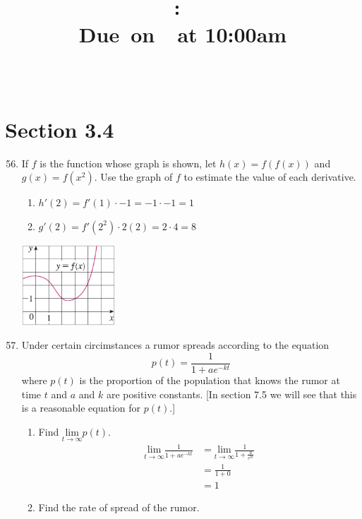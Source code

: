 \documentclass{article}
\title{
    \vspace{2in}
    \textmd{\textbf{\hmwkClass:\ \hmwkTitle}}\\
    \normalsize\vspace{0.1in}\small{Due\ on\ \hmwkDueDate\ at 10:00am}\\
    \vspace{0.1in}\large{\textit{\hmwkClassInstructor\ \hmwkClassTime}}
    \vspace{3in}
}
\author{\hmwkAuthorName}
\date{}
\begin{document}
\maketitle

\pagebreak

\section{Section 3.4}

\begin{enumerate}
\setcounter{enumi}{55}
	\item If $f$ is the function whose graph is shown, let $h(x)=f(f(x))$ and $g(x)=f(x^2)$. Use the graph of $f$ to estimate the value of each derivative.
		\begin{enumerate}
			\item $h'(2) = f'(1)\cdot -1 = -1 \cdot -1 = 1$
			\item $g'(2) = f'(2^2)\cdot 2(2) = 2\cdot 4 = 8$
		\end{enumerate}
		\begin{center}
			\includegraphics[width=3.5cm]{images/s34p56}
		\end{center}
\setcounter{enumi}{73}
	\item Under certain circimstances a rumor spreads according to the equation $$p(t)=\frac{1}{1+ae^{-kt}}$$ where $p(t)$ is the proportion of the population that knows the rumor at time $t$ and $a$ and $k$ are positive constants. [In section 7.5 we will see that this is a reasonable equation for $p(t)$.]
		\begin{enumerate}
			\item Find $\underset{t\rightarrow \infty}{\text{lim}}p(t)$.
				$$\begin{align}
					\underset{t\rightarrow \infty}{\text{lim}} \frac{1}{1+ae^{-kt}} &= \underset{t\rightarrow \infty}{\text{lim}}\frac{1}{1+\frac{a}{e^{kt}}}\\
					&= \frac{1}{1+0}\\
					&= 1
				\end{align}$$
			\item Find the rate of spread of the rumor.
				$$\begin{align}

\end{align}$$
\end{enumerate}
\end{enumerate}
\end{document}
